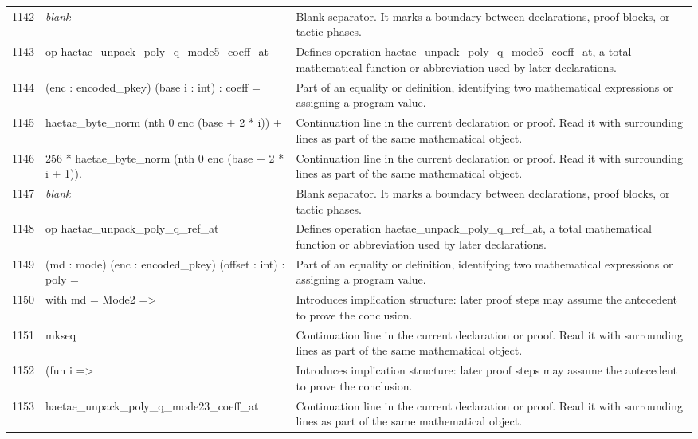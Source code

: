 \documentclass[10pt]{article}
\begin{document}
\begin{longtable}{r L{0.53\textwidth} L{0.37\textwidth}}
1142 & {\ttfamily\scriptsize \emph{blank}} & Blank separator.  It marks a boundary between declarations, proof blocks, or tactic phases. \\
1143 & {\ttfamily\scriptsize op haetae\_unpack\_poly\_q\_mode5\_coeff\_at} & Defines operation haetae\_unpack\_poly\_q\_mode5\_coeff\_at, a total mathematical function or abbreviation used by later declarations. \\
1144 & {\ttfamily\scriptsize    (enc : encoded\_pkey) (base i : int) : coeff =} & Part of an equality or definition, identifying two mathematical expressions or assigning a program value. \\
1145 & {\ttfamily\scriptsize   haetae\_byte\_norm (nth 0 enc (base + 2 * i)) +} & Continuation line in the current declaration or proof.  Read it with surrounding lines as part of the same mathematical object. \\
1146 & {\ttfamily\scriptsize   256 * haetae\_byte\_norm (nth 0 enc (base + 2 * i + 1)).} & Continuation line in the current declaration or proof.  Read it with surrounding lines as part of the same mathematical object. \\
1147 & {\ttfamily\scriptsize \emph{blank}} & Blank separator.  It marks a boundary between declarations, proof blocks, or tactic phases. \\
1148 & {\ttfamily\scriptsize op haetae\_unpack\_poly\_q\_ref\_at} & Defines operation haetae\_unpack\_poly\_q\_ref\_at, a total mathematical function or abbreviation used by later declarations. \\
1149 & {\ttfamily\scriptsize    (md : mode) (enc : encoded\_pkey) (offset : int) : poly =} & Part of an equality or definition, identifying two mathematical expressions or assigning a program value. \\
1150 & {\ttfamily\scriptsize   with md = Mode2 =>} & Introduces implication structure: later proof steps may assume the antecedent to prove the conclusion. \\
1151 & {\ttfamily\scriptsize     mkseq} & Continuation line in the current declaration or proof.  Read it with surrounding lines as part of the same mathematical object. \\
1152 & {\ttfamily\scriptsize       (fun i =>} & Introduces implication structure: later proof steps may assume the antecedent to prove the conclusion. \\
1153 & {\ttfamily\scriptsize         haetae\_unpack\_poly\_q\_mode23\_coeff\_at} & Continuation line in the current declaration or proof.  Read it with surrounding lines as part of the same mathematical object. \\

\end{longtable}
\end{document}
